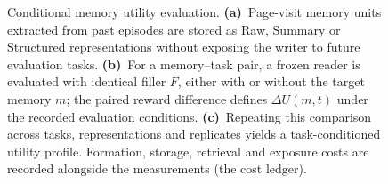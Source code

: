 \begin{figure}[t]
\begin{tikzpicture}
\end{tikzpicture}
\caption{Conditional memory utility evaluation. \textbf{(a)}~Page-visit memory
units extracted from past episodes are stored as Raw, Summary or Structured
representations without exposing the writer to future evaluation tasks.
\textbf{(b)}~For a memory--task pair, a frozen reader is evaluated with identical
filler $F$, either with or without the target memory $m$; the paired reward
difference defines $\Delta U(m,t)$ under the recorded evaluation conditions.
\textbf{(c)}~Repeating this comparison across tasks, representations and
replicates yields a task-conditioned utility profile. Formation, storage,
retrieval and exposure costs are recorded alongside the measurements (the
cost ledger).}
\label{fig:pipeline}
\end{figure}
